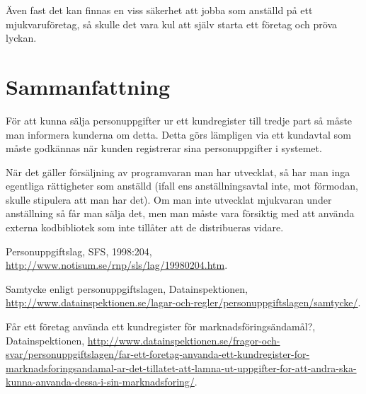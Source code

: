 \documentclass[12pt]{article}
\begin{document}
	Även fast det kan finnas en viss säkerhet att jobba som anställd på ett mjukvaruföretag, så skulle det vara kul att själv starta ett företag och pröva lyckan. 

	\section{Sammanfattning}
	För att kunna sälja personuppgifter ur ett kundregister till tredje part så måste man informera kunderna om detta. Detta görs lämpligen via ett kundavtal som måste godkännas när kunden registrerar sina personuppgifter i systemet. 
	
	När det gäller försäljning av programvaran man har utvecklat, så har man inga egentliga rättigheter som anställd (ifall ens anställningsavtal inte, mot förmodan, skulle stipulera att man har det). Om man inte utvecklat mjukvaran under anställning så får man sälja det, men man måste vara försiktig med att använda externa kodbibliotek som inte tillåter att de distribueras vidare.

\begin{thebibliography}{9}

  Personuppgiftslag,
  SFS,
  1998:204,
  \url{ http://www.notisum.se/rnp/sls/lag/19980204.htm}.

  Samtycke enligt personuppgiftslagen,
  Datainspektionen,
  \url{http://www.datainspektionen.se/lagar-och-regler/personuppgiftslagen/samtycke/}.

   Får ett företag använda ett kundregister för marknadsföringsändamål?,
   Datainspektionen,
  \url{http://www.datainspektionen.se/fragor-och-svar/personuppgiftslagen/far-ett-foretag-anvanda-ett-kundregister-for-marknadsforingsandamal-ar-det-tillatet-att-lamna-ut-uppgifter-for-att-andra-ska-kunna-anvanda-dessa-i-sin-marknadsforing/}.

\end{thebibliography}
\end{document}
